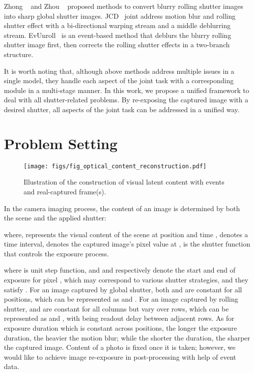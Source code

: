 \documentclass[10pt,twocolumn,letterpaper]{article}
\begin{document}
Zhong \etal~\cite{JCD} and Zhou \etal~\cite{EvUnroll}  proposed methods to convert blurry rolling shutter images into sharp global shutter images. 
JCD~\cite{JCD} joint address motion blur and rolling shutter effect with a bi-directional warping stream and a middle deblurring stream.
EvUnroll~\cite{EvUnroll} is an event-based method that deblurs the blurry rolling shutter image first, then corrects the rolling shutter effects in a two-branch structure.

It is worth noting that, although above methods address multiple issues in a single model, they handle each aspect of the joint task with a corresponding module in a multi-stage manner.
In this work, we propose a unified framework to deal with all shutter-related problems. By re-exposing the captured image with a desired shutter, all aspects of the joint task can be addressed in a unified way.  









 
\section{Problem Setting}
\label{sec:Problem Setting}

\begin{figure*}
	\centering
	\texttt{[image: figs/fig\_optical\_content\_reconstruction.pdf]}
	\caption{Illustration of the construction of visual latent content with events and real-captured frame(s).}
	\label{fig:visual_latent_space_construction}
	\vspace{-1.0em}
\end{figure*}



In the camera imaging process, the content of an image is determined by both the scene and the applied shutter:



where,  represents the visual content of the scene at position  and time ,  denotes a time interval,  denotes the captured image's pixel value at ,  is the shutter function that controls the exposure process. 

where  is unit step function, and  and  respectively denote the start and end of exposure for pixel , which may correspond to various shutter strategies, and they satisfy .
For an image captured by global shutter, both  and  are constant for all positions, which can be represented as  and .
For an image captured by rolling shutter, 
 and  are constant for all columns but vary over rows, which can be represented as  
and ,
with 
 being readout delay between adjacent rows.
As for exposure duration  which is constant across positions, the longer the exposure duration, the heavier the motion blur; while the shorter the duration, the sharper the captured image.
Content of a photo is fixed once it is taken; however, we would like to achieve image re-exposure in post-processing with help of event data.
\end{document}
